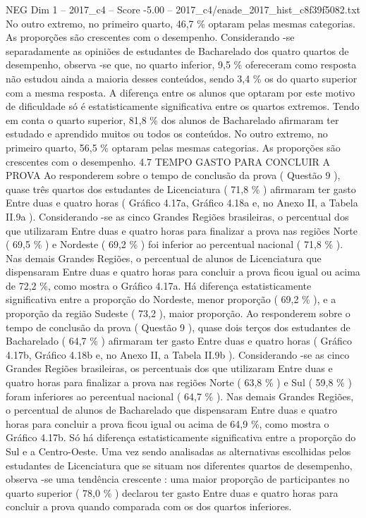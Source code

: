 \begin{textsample}{NEG Dim 1 – 2017\_c4 – Score -5.00 – 2017\_c4/enade\_2017\_hist\_c8f39f5082.txt}
No outro extremo, no primeiro quarto, 46,7 \% optaram pelas mesmas categorias.
As proporções são crescentes com o desempenho.
Considerando -se separadamente as opiniões de estudantes de Bacharelado dos quatro quartos de desempenho, observa -se que, no quarto inferior, 9,5 \% ofereceram como resposta não estudou ainda a maioria desses conteúdos, sendo 3,4 \% os do quarto superior com a mesma resposta.
A diferença entre os alunos que optaram por este motivo de dificuldade só é estatisticamente significativa entre os quartos extremos.
Tendo em conta o quarto superior, 81,8 \% dos alunos de Bacharelado afirmaram ter estudado e aprendido muitos ou todos os conteúdos.
No outro extremo, no primeiro quarto, 56,5 \% optaram pelas mesmas categorias.
As proporções são crescentes com o desempenho. 4.7 TEMPO GASTO PARA CONCLUIR A PROVA Ao responderem sobre o tempo de conclusão da prova ( Questão 9 ), quase três quartos dos estudantes de Licenciatura ( 71,8 \% ) afirmaram ter gasto Entre duas e quatro horas ( Gráfico 4.17a, Gráfico 4.18a e, no Anexo II, a Tabela II.9a ).
Considerando -se as cinco Grandes Regiões brasileiras, o percentual dos que utilizaram Entre duas e quatro horas para finalizar a prova nas regiões Norte ( 69,5 \% ) e Nordeste ( 69,2 \% ) foi inferior ao percentual nacional ( 71,8 \% ).
Nas demais Grandes Regiões, o percentual de alunos de Licenciatura que dispensaram Entre duas e quatro horas para concluir a prova ficou igual ou acima de 72,2 \%, como mostra o Gráfico 4.17a.
Há diferença estatisticamente significativa entre a proporção do Nordeste, menor proporção ( 69,2 \% ), e a proporção da região Sudeste ( 73,2 ), maior proporção.
Ao responderem sobre o tempo de conclusão da prova ( Questão 9 ), quase dois terços dos estudantes de Bacharelado ( 64,7 \% ) afirmaram ter gasto Entre duas e quatro horas ( Gráfico 4.17b, Gráfico 4.18b e, no Anexo II, a Tabela II.9b ).
Considerando -se as cinco Grandes Regiões brasileiras, os percentuais dos que utilizaram Entre duas e quatro horas para finalizar a prova nas regiões Norte ( 63,8 \% ) e Sul ( 59,8 \% ) foram inferiores ao percentual nacional ( 64,7 \% ).
Nas demais Grandes Regiões, o percentual de alunos de Bacharelado que dispensaram Entre duas e quatro horas para concluir a prova ficou igual ou acima de 64,9 \%, como mostra o Gráfico 4.17b.
Só há diferença estatisticamente significativa entre a proporção do Sul e a Centro-Oeste.
Uma vez sendo analisadas as alternativas escolhidas pelos estudantes de Licenciatura que se situam nos diferentes quartos de desempenho, observa -se uma tendência crescente : uma maior proporção de participantes no quarto superior ( 78,0 \% ) declarou ter gasto Entre duas e quatro horas para concluir a prova quando comparada com os dos quartos inferiores.

\end{textsample}
